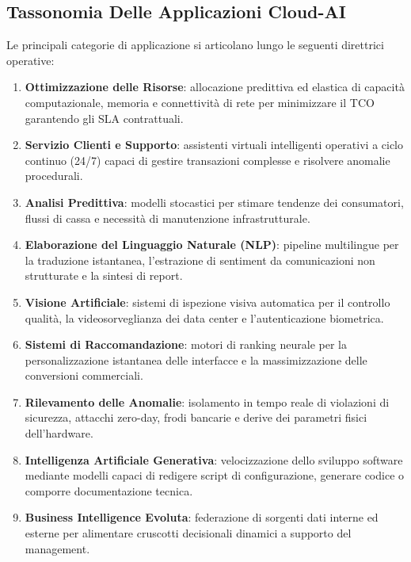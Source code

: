 \documentclass[11pt, a4paper]{article}
\begin{document}
\subsection{Tassonomia Delle Applicazioni Cloud-AI}

Le principali categorie di applicazione si articolano lungo le seguenti direttrici operative:
\begin{enumerate}
    \item \textbf{Ottimizzazione delle Risorse}: allocazione predittiva ed elastica di capacità computazionale, memoria e connettività di rete per minimizzare il TCO garantendo gli SLA contrattuali.
    \item \textbf{Servizio Clienti e Supporto}: assistenti virtuali intelligenti operativi a ciclo continuo (24/7) capaci di gestire transazioni complesse e risolvere anomalie procedurali.
    \item \textbf{Analisi Predittiva}: modelli stocastici per stimare tendenze dei consumatori, flussi di cassa e necessità di manutenzione infrastrutturale.
    \item \textbf{Elaborazione del Linguaggio Naturale (NLP)}: pipeline multilingue per la traduzione istantanea, l'estrazione di sentiment da comunicazioni non strutturate e la sintesi di report.
    \item \textbf{Visione Artificiale}: sistemi di ispezione visiva automatica per il controllo qualità, la videosorveglianza dei data center e l'autenticazione biometrica.
    \item \textbf{Sistemi di Raccomandazione}: motori di ranking neurale per la personalizzazione istantanea delle interfacce e la massimizzazione delle conversioni commerciali.
    \item \textbf{Rilevamento delle Anomalie}: isolamento in tempo reale di violazioni di sicurezza, attacchi zero-day, frodi bancarie e derive dei parametri fisici dell'hardware.
    \item \textbf{Intelligenza Artificiale Generativa}: velocizzazione dello sviluppo software mediante modelli capaci di redigere script di configurazione, generare codice o comporre documentazione tecnica.
    \item \textbf{Business Intelligence Evoluta}: federazione di sorgenti dati interne ed esterne per alimentare cruscotti decisionali dinamici a supporto del management.
\end{enumerate}

\end{document}

